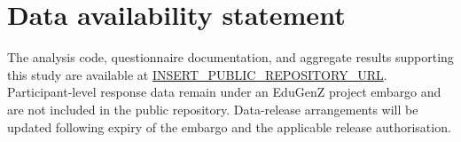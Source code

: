 \section*{Data availability statement}

The analysis code, questionnaire documentation, and aggregate
results supporting this study are available at
\url{INSERT_PUBLIC_REPOSITORY_URL}.
Participant-level response data remain under an EduGenZ
project embargo and are not included in the public repository.
Data-release arrangements will be updated following expiry
of the embargo and the applicable release authorisation.
